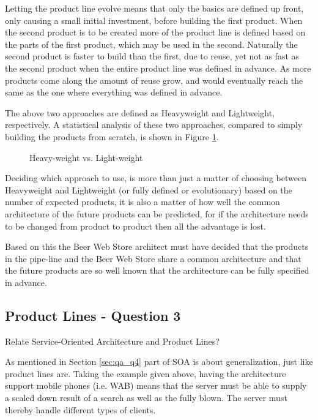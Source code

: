 Letting the product line evolve means that only the basics are defined up front, only causing a small initial investment, before building the first product. When the second product is to be created more of the product line is defined based on the parts of the first product, which may be used in the second. Naturally the second product is faster to build than the first, due to reuse, yet not as fast as the second product when the entire product line was defined in advance. As more products come along the amount of reuse grow, and would eventually reach the same as the one where everything was defined in advance.

The above two approaches are defined as Heavyweight and Lightweight, respectively. A statistical analysis of these two approaches, compared to simply building the products from scratch, is shown in Figure \ref{fig:product-line}.

\begin{figure}[!htb]
\centerline{}
\caption{Heavy-weight vs. Light-weight \cite{mcgregor2002}}
\label{fig:product-line}
\end{figure}

Deciding which approach to use, is more than just a matter of choosing between Heavyweight and Lightweight (or fully defined or evolutionary) based on the number of expected products, it is also a matter of how well the common architecture of the future products can be predicted, for if the architecture needs to be changed from product to product then all the advantage is lost.

Based on this the Beer Web Store architect must have decided that the products in the pipe-line and the Beer Web Store share a common architecture and that the future products are so well known that the architecture can be fully specified in advance.

\subsection{Product Lines - Question 3}

\begin{question}
Relate Service-Oriented Architecture and Product Lines?
\end{question}

As mentioned in Section \ref{sec:qa_q4} part of SOA is about generalization, just like product lines are. Taking the example given above, having the architecture support mobile phones (i.e. WAB) means that the server must be able to supply a scaled down result of a search as well as the fully blown. The server must thereby handle different types of clients.

